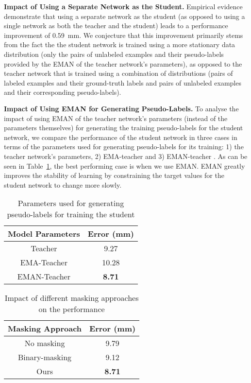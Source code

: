 \documentclass{article}
\begin{document}
\textbf{Impact of Using a Separate Network as the Student.} Empirical evidence demonstrate that using a separate network as the student (as opposed to using a single network as both the teacher and the student) leads to a performance improvement of 0.59~mm. We conjecture that this improvement primarily stems from the fact the the student network is trained using a more stationary data distribution (only the pairs of unlabeled examples and their pseudo-labels provided by the EMAN of the teacher network's parameters), as opposed to the teacher network that is trained using a combination of distributions (pairs of labeled examples and their ground-truth labels and pairs of unlabeled examples and their corresponding pseudo-labels).
\par


\textbf{Impact of Using EMAN for Generating Pseudo-Labels.} To analyse the impact of using EMAN of the teacher network's parameters (instead of the parameters themselves) for generating the training pseudo-labels for the student network, we compare the performance of the student network in three cases in terms of the parameters used for generating pseudo-labels for its training: 1) the teacher network's parameters, 2) EMA-teacher \cite{tarvainen2017mean} and 3) EMAN-teacher \cite{cai2021exponential}. As can be seen in Table~\ref{tab:params}, the best performing case is when we use EMAN. EMAN greatly improves the stability of learning by constraining the target values for the student network to change more slowly.

\begin{table}[t]
\caption{Parameters used for generating pseudo-labels for training the student}
\setlength{\tabcolsep}{4pt}
\centering
\begin{tabular}{cc}
            \hline
            Model Parameters  &   Error (mm)  \\
            \hline
                Teacher                  &         9.27 \\
                EMA-Teacher              &         10.28 \\
                EMAN-Teacher              &         \textbf{8.71} \\
        
            \hline
        \end{tabular}
        \label{tab:params}
\end{table}

\begin{table}[t]
\caption{Impact of different masking approaches on the performance}
\setlength{\tabcolsep}{4pt}
\centering
\begin{tabular}{cc}
\hline
            Masking Approach  &   Error (mm)  \\
            \hline
                No masking          &         9.79 \\
                Binary-masking      &       9.12 \\
                Ours                &        \textbf{ 8.71} \\
        
        
        \hline
        \end{tabular}
        \label{tab:masking}
\end{table}
\end{document}
